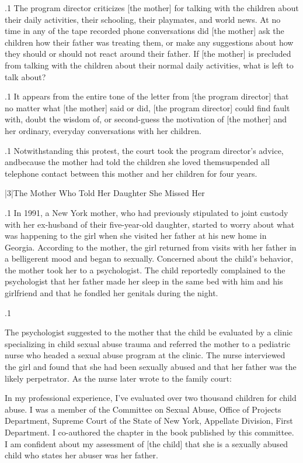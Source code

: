 \documentclass[11pt, twoside]{article}
\begin{document}
{\p.1{%
The program director criticizes [the mother] for talking with
the children about their daily activities, their schooling, their playmates, and world news. At no time in any of the tape recorded
phone conversations did [the mother] ask the children how their
father was treating them, or make any suggestions about how they
should or should not react around their father. If [the mother] is
precluded from talking with the children about their normal daily
activities, what is left to talk about?
}%

\p.1{%
It appears from the entire tone of the letter from [the program director] that no matter what [the mother] said or did, [the program
director] could find fault with, doubt the wisdom of, or
second-guess the motivation of [the mother] and her ordinary, everyday
conversations with her children.
}%

\p.1{%
Notwithstanding this protest, the court took the program director’s
advice, and\mdash{}because the mother had told the children she loved
them\mdash{}suspended all telephone contact between this mother and her children
for four years.
}%


\s|3|{The Mother Who Told Her Daughter She Missed Her}

\p.1{%
\noindent{}In 1991, a New York mother, who had previously stipulated to joint
custody with her ex-husband of their five-year-old daughter, started
to worry about what was happening to the girl when she visited her
father at his new home in Georgia. According to the mother, the girl
returned from visits with her father in a belligerent mood and began to  sexually. Concerned about the child’s behavior, the
mother took her to a psychologist. The child reportedly complained
to the psychologist that her father made her sleep in the same bed
with him and his girlfriend and that he fondled her genitals during the
night.
}%

\p.1{%
The psychologist suggested to the mother that the child be evaluated
by a clinic specializing in child sexual abuse trauma and referred the
mother to a pediatric nurse who headed a sexual abuse program at the
clinic. The nurse interviewed the girl and found that she had been sexually abused and that her father was the likely perpetrator. As the nurse
later wrote to the family court:

\begin{blockQuote}
In my professional experience, I’ve evaluated over two thousand
children for child abuse. I was a member of the Committee on
Sexual Abuse, Office of Projects Department, Supreme Court of
the State of New York, Appellate Division, First Department.
I co-authored the chapter  in the book published by this committee. I am confident
about my assessment of [the child] that she is a sexually abused
child who states her abuser was her father.
\end{blockQuote}

}}
\end{document}
